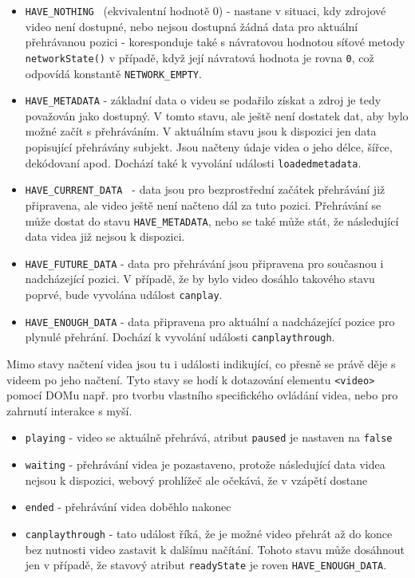 \begin{itemize}
	\item \texttt{HAVE\_NOTHING } (ekvivalentní hodnotě 0) \newline
	 - nastane v situaci, kdy zdrojové video není dostupné, nebo nejsou dostupná žádná data pro aktuální přehrávanou pozici \newline - koresponduje také s návratovou hodnotou síťové metody \texttt{networkState()} v případě, když její návratová hodnota je rovna \texttt{0}, což odpovídá konstantě \texttt{NETWORK\_EMPTY}.
	\item \texttt{HAVE\_METADATA} \newline
		-  základní data o videu se podařilo získat a zdroj je tedy považován jako dostupný. V tomto stavu, ale ještě není dostatek dat, aby bylo možné začít s přehráváním. V aktuálním stavu jsou k dispozici jen data popisující přehrávány subjekt. Jsou načteny údaje videa o jeho délce, šířce, dekódovaní apod. Dochází  také k vyvolání události \texttt{loadedmetadata}.
	\item \texttt{HAVE\_CURRENT\_DATA }\newline
		- data jsou pro bezprostřední začátek přehrávání již  připravena, ale video ještě není načteno dál za tuto pozici. Přehrávání se může  dostat do stavu \texttt{HAVE\_METADATA}, nebo se také může stát, že  následující data videa již nejsou k dispozici.
	\item \texttt{HAVE\_FUTURE\_DATA}\newline
		- data pro přehrávání jsou připravena pro současnou i nadcházející pozici. V případě, že by bylo video dosáhlo takového stavu poprvé, bude vyvolána událost \texttt{canplay}.
	\item \texttt{HAVE\_ENOUGH\_DATA}\newline
		- data připravena pro aktuální a nadcházející pozice pro plynulé přehrání. Dochází k vyvolání události \texttt{canplaythrough}.
\end{itemize}

Mimo stavy načtení videa jsou tu i události indikující, co přesně se právě děje s videem po jeho načtení. Tyto stavy se hodí k dotazování elementu \texttt{<video>} pomocí DOMu např. pro tvorbu vlastního specifického ovládání videa, nebo pro zahrnutí interakce s myší.



\begin{itemize}
	\item \texttt{playing} - video se aktuálně přehrává, atribut \texttt{paused} je nastaven na \texttt{false}	
	\item \texttt{waiting} - přehrávání videa je pozastaveno, protože následující data videa nejsou k dispozici, webový prohlížeč ale očekává, že v vzápětí dostane
	\item \texttt{ended} - přehrávání videa doběhlo nakonec
	\item \texttt{canplaythrough} - tato událost říká, že je možné video přehrát až do konce bez nutnosti video zastavit k dalšímu načítání. Tohoto stavu může dosáhnout jen v případě, že stavový atribut \texttt{readyState} je roven \texttt{HAVE\_ENOUGH\_DATA}.
	
\end{itemize}

